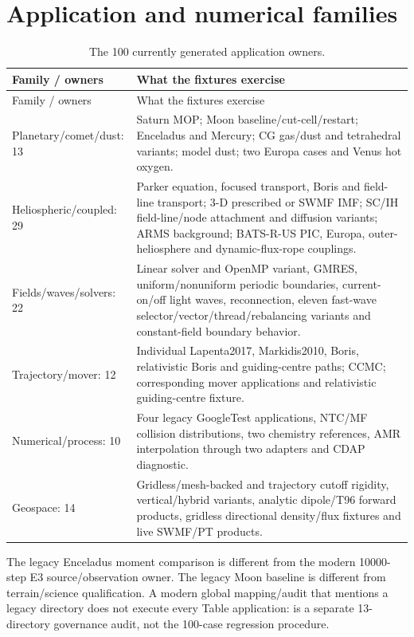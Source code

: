 \section{Application and numerical families}
\begin{longtable}{L{0.29\textwidth}L{0.61\textwidth}}
\caption{The 100 currently generated application owners.}\\
\toprule Family / owners & What the fixtures exercise\\\midrule\endfirsthead
\toprule Family / owners & What the fixtures exercise\\\midrule\endhead
Planetary/comet/dust: 13 & Saturn MOP; Moon baseline/cut-cell/restart;
Enceladus and Mercury; CG gas/dust and tetrahedral variants; model dust;
two Europa cases and Venus hot oxygen.\\
Heliospheric/coupled: 29 & Parker equation, focused transport, Boris and
field-line transport; 3-D prescribed or SWMF IMF; SC/IH field-line/node
attachment and diffusion variants; ARMS background; BATS-R-US PIC, Europa,
outer-heliosphere and dynamic-flux-rope couplings.\\
Fields/waves/solvers: 22 & Linear solver and OpenMP variant, GMRES,
uniform/nonuniform periodic boundaries, current-on/off light waves,
reconnection, eleven fast-wave selector/vector/thread/rebalancing variants
and constant-field boundary behavior.\\
Trajectory/mover: 12 & Individual Lapenta2017, Markidis2010, Boris,
relativistic Boris and guiding-centre paths; CCMC; corresponding mover
applications and relativistic guiding-centre fixture.\\
Numerical/process: 10 & Four legacy GoogleTest applications, NTC/MF
collision distributions, two chemistry references, AMR interpolation through
two adapters and CDAP diagnostic.\\
Geospace: 14 & Gridless/mesh-backed and trajectory cutoff rigidity,
vertical/hybrid variants, analytic dipole/T96 forward products, gridless
directional density/flux fixtures and live SWMF/PT products.\\
\bottomrule
\end{longtable}
The legacy Enceladus moment comparison is different from the modern
10000-step E3 source/observation owner. The legacy Moon baseline is different
from terrain/science qualification. A modern global mapping/audit that
mentions a legacy directory does not execute every Table application:
 is a separate 13-directory governance
audit, not the 100-case regression procedure.

